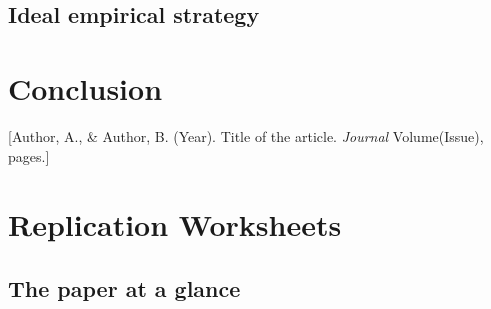 \documentclass[12pt,a4paper]{article}
\newif\ifshowinstr
\newcommand{\instr}[1]{\ifshowinstr{\leavevmode\color{gray}\itshape\small [#1]\par}\fi}
\begin{document}
\subsection{Ideal empirical strategy}

\instr{Please describe the best empirical design you could implement if there were no restrictions on data availability (or on money and ethics, in the case of an experiment).}


\section{Conclusion}


\begin{thebibliography}{0}
 [Author, A., \& Author, B. (Year). Title of the article.
\textit{Journal} Volume(Issue), pages.]
\end{thebibliography}

\clearpage
\appendix
\section{Replication Worksheets}

\instr{Please fill in these worksheets and submit them together with your report. Keywords are sufficient. The worksheets do not count toward the page limit. Add rows or columns where your paper requires it.}

\subsection{The paper at a glance}
\end{document}
